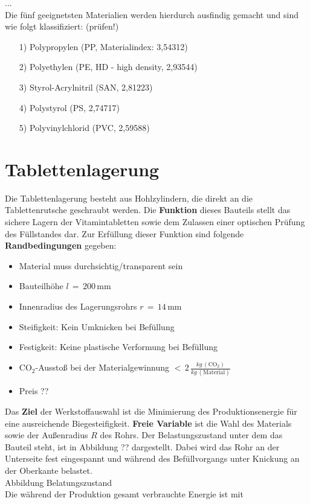...\\
Die fünf geeignetsten Materialien werden hierdurch ausfindig gemacht und sind wie folgt klassifiziert: (prüfen!)
\begin{itemize}
	\item[1)] Polypropylen (PP, Materialindex: 3,54312)
	\item[2)] Polyethylen (PE, HD - high density, 2,93544)
	\item[3)] Styrol-Acrylnitril (SAN, 2,81223)
	\item[4)] Polystyrol (PS, 2,74717)
	\item[5)] Polyvinylchlorid (PVC, 2,59588)
\end{itemize}

\section{Tablettenlagerung}
Die Tablettenlagerung besteht aus Hohlzylindern, die direkt an die Tablettenrutsche geschraubt werden. Die \textbf{Funktion} dieses Bauteils stellt das sichere Lagern der Vitamintabletten sowie dem Zulassen einer optischen Prüfung des Füllstandes dar. Zur Erfüllung dieser Funktion sind folgende \textbf{Randbedingungen} gegeben:
\begin{itemize}
	\item Material muss durchsichtig/transparent sein
	\item Bauteilhöhe $l\,=\,200\,$mm
	\item Innenradius des Lagerungsrohrs $r\,=\,14\,$mm
	\item Steifigkeit: Kein Umknicken bei Befüllung
	\item Festigkeit: Keine plastische Verformung bei Befüllung
	\item CO$_2$-Ausstoß bei der Materialgewinnung $<\,2\,\frac{kg\,(\text{CO}_2)}{kg\,(\text{Material})}$
	\item Preis ??
\end{itemize}
Das \textbf{Ziel} der Werkstoffauswahl ist die Minimierung des Produktionsenergie für eine ausreichende Biegesteifigkeit. \textbf{Freie Variable} ist die Wahl des Materials sowie der Außenradius $R$ des Rohrs. Der Belastungszustand unter dem das Bauteil steht, ist in Abbildung ?? dargestellt. Dabei wird das Rohr an der Unterseite fest eingespannt und während des Befüllvorgangs unter Knickung an der Oberkante belastet.\\
Abbildung Belatungszustand\\
Die während der Produktion gesamt verbrauchte Energie ist mit
